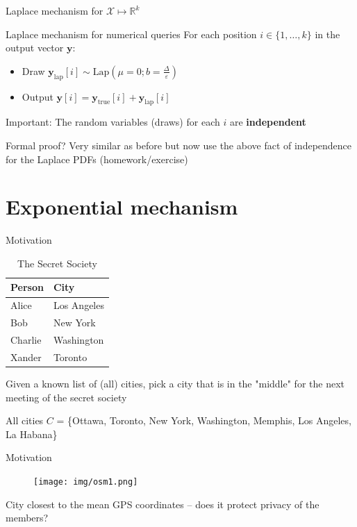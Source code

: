 \documentclass[12pt,aspectratio=169,handout]{beamer}
\begin{document}
\begin{frame}{Laplace mechanism for $\mathcal{X} \mapsto \mathbb{R}^k$}

\begin{block}{Laplace mechanism for numerical queries}
For each position $i \in \{1, \dots, k\}$ in the output vector $\mathbf{y}$:
\begin{itemize}
\item Draw $\mathbf{y}_{\mathrm{lap}}[i] \sim \textrm{Lap}(\mu = 0; b=\frac{\Delta}{\varepsilon})$
\item Output $\mathbf{y}[i] = \mathbf{y}_{\mathrm{true}}[i] + \mathbf{y}_{\mathrm{lap}}[i]$
\end{itemize}
\end{block}

Important: The random variables (draws) for each $i$ are \textbf{independent}

Formal proof? Very similar as before but now use the above fact of independence for the Laplace PDFs (homework/exercise)

\end{frame}

\section{Exponential mechanism}


\begin{frame}{Motivation}

\begin{table}
\scriptsize
\begin{tabular}{ll}
\toprule
Person & City \\ \midrule
Alice & Los Angeles \\
Bob & New York \\
Charlie & Washington \\
Xander & Toronto \\ \bottomrule
\end{tabular}
\caption{The Secret Society}
\end{table}

Given a known list of (all) cities, pick a city that is in the "middle" for the next meeting of the secret society

All cities $C$ = \{Ottawa, Toronto, New York, Washington, Memphis, Los Angeles, La Habana\}
\end{frame}


\begin{frame}{Motivation}
\begin{figure}
\texttt{[image: img/osm1.png]}
\end{figure}
City closest to the mean GPS coordinates -- does it protect privacy of the members?
\end{frame}
\end{document}
